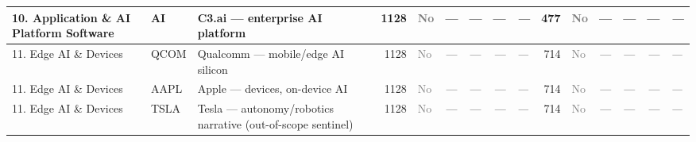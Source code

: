 \begin{table}[htbp]
\begin{tabular}{llp{3cm}r l cc r l  r l cc r l}
10. Application \& AI Platform Software & AI & C3.ai --- enterprise AI platform & 1128 & \textcolor{gray}{No} & --- & --- & --- & \textit{---} & 477 & \textcolor{gray}{No} & --- & --- & --- & \textit{---} \\
\midrule
11. Edge AI \& Devices & QCOM & Qualcomm --- mobile/edge AI silicon & 1128 & \textcolor{gray}{No} & --- & --- & --- & \textit{---} & 714 & \textcolor{gray}{No} & --- & --- & --- & \textit{---} \\
11. Edge AI \& Devices & AAPL & Apple --- devices, on-device AI & 1128 & \textcolor{gray}{No} & --- & --- & --- & \textit{---} & 714 & \textcolor{gray}{No} & --- & --- & --- & \textit{---} \\
11. Edge AI \& Devices & TSLA & Tesla --- autonomy/robotics narrative (out-of-scope sentinel) & 1128 & \textcolor{gray}{No} & --- & --- & --- & \textit{---} & 714 & \textcolor{gray}{No} & --- & --- & --- & \textit{---} \\
\bottomrule
\end{tabular}
\end{table}